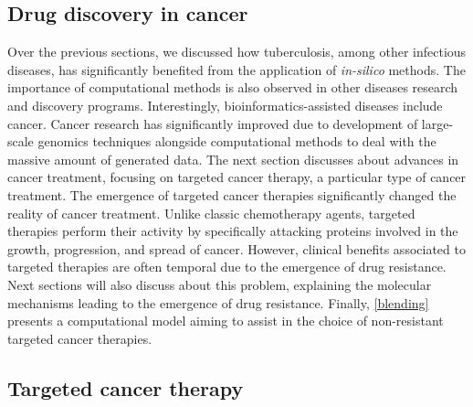 \documentclass[11pt, b5paper,twoside]{tesi_upf}
\begin{document}
\subsection{Drug discovery in cancer}\label{dd_cancer}

\par Over the previous sections, we discussed how tuberculosis, among other infectious diseases, has significantly benefited from the application of \textit{in-silico} methods. The importance of computational methods is also observed in other diseases research and discovery programs. Interestingly, bioinformatics-assisted diseases include cancer. Cancer research has significantly improved due to development of large-scale genomics techniques alongside computational methods to deal with the massive amount of generated data. The next section discusses about advances in cancer treatment, focusing on targeted cancer therapy, a particular type of cancer treatment. The emergence of targeted cancer therapies significantly changed the reality of cancer treatment. Unlike classic chemotherapy agents, targeted therapies perform their activity by specifically attacking proteins involved in the growth, progression, and spread of cancer. However, clinical benefits associated to targeted therapies are often temporal due to the emergence of drug resistance. Next sections will also discuss about this problem, explaining the molecular mechanisms leading to the emergence of drug resistance. Finally, \cref{blending} presents a computational model aiming to assist in the choice of non-resistant targeted cancer therapies. 

\subsection{Targeted cancer therapy}\label{targeted therapies}
\end{document}
